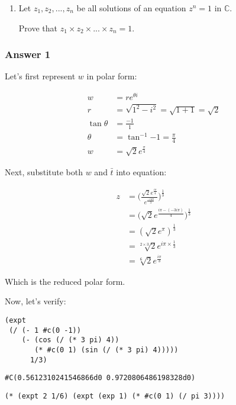 \documentclass[11pt]{article}
\begin{document}
\begin{enumerate}
\item Let $z_1, z_2, ..., z_n$ be all solutions of an equation $z^n=1$ in $\mathbb{C}$.

Prove that $z_1 \times z_2 \times ... \times z_n = 1$.
\end{enumerate}

\subsubsection{Answer 1}
\label{sec-1-1-1}
Let's first represent $w$ in polar form:

\begin{align*}
  w            &= re^{\theta i} \\
  r            &= \sqrt{1^2 - i^2} = \sqrt{1 + 1} = \sqrt{2} \\
  \tan{\theta} &= \frac{-1}{1} \\
  \theta       &= \tan^{-1}{-1} = \frac{\pi}{4} \\
  w            &= \sqrt{2}e^{\frac{\pi}{4}}
\end{align*}

Next, substitute both $w$ and $\bar{t}$ into equation:

\begin{align*}
  z &= \Big(\frac{\sqrt{2}e^{\frac{i\pi}{4}}}{e^{\frac{-i4\pi}{3}}}\Big)^{\frac{1}{3}} \\
    &= \big(\sqrt{2}e^{\frac{i\pi - (-3i\pi)}{4}}\big)^{\frac{1}{3}} \\
    &= (\sqrt{2}e^{\pi})^{\frac{1}{3}} \\
    &= \sqrt[2\times 3]{2}e^{i\pi \times \frac{1}{3}} \\
    &= \sqrt[6]{2}e^{\frac{i\pi}{3}}
\end{align*}

Which is the reduced polar form.

Now, let's verify:

\lstset{language=Lisp,numbers=none}
\begin{lstlisting}
(expt
 (/ (- 1 #c(0 -1))
    (- (cos (/ (* 3 pi) 4))
       (* #c(0 1) (sin (/ (* 3 pi) 4)))))
      1/3)
\end{lstlisting}

\begin{verbatim}
#C(0.5612310241546866d0 0.9720806486198328d0)
\end{verbatim}

\lstset{language=Lisp,numbers=none}
\begin{lstlisting}
(* (expt 2 1/6) (expt (exp 1) (* #c(0 1) (/ pi 3))))
\end{lstlisting}
\end{document}
